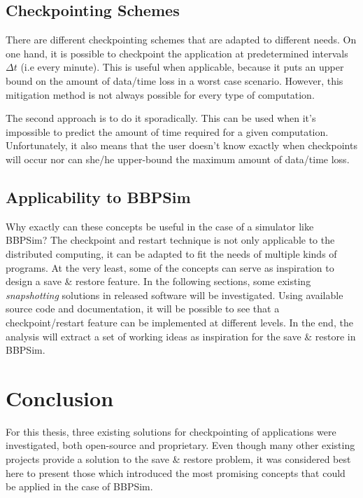 {\subsection*{Checkpointing Schemes}
There are different checkpointing schemes that are adapted to different needs. On one hand, it is possible to checkpoint the application at predetermined intervals $\Delta t$ (i.e every minute). This is useful when applicable, because it puts an upper bound on the amount of data/time loss in a worst case scenario. However, this mitigation method is not always possible for every type of computation. 

The second approach is to do it sporadically. This can be used when it's impossible to predict the amount of time required for a given computation. Unfortunately, it also means that the user doesn't know exactly when checkpoints will occur nor can she/he upper-bound the maximum amount of data/time loss.

\subsection*{Applicability to BBPSim}
Why exactly can these concepts be useful in the case of a simulator like BBPSim? The checkpoint and restart technique is not only applicable to the distributed computing, it can be adapted to fit the needs of multiple kinds of programs. At the very least, some of the concepts can serve as inspiration to design a save \& restore feature. In the following sections, some existing \textit{snapshotting} solutions in released software will be investigated. Using available source code and documentation, it will be possible to see that a checkpoint/restart feature can be implemented at different levels. In the end, the analysis will extract a set of working ideas as inspiration for the save \& restore in BBPSim.





\section{Conclusion}
For this thesis, three existing solutions for checkpointing of applications were investigated, both open-source and proprietary. Even though many other existing projects provide a solution to the save \& restore problem, it was considered best here to present those which introduced the most promising concepts that could be applied in the case of \gls{BBPSim}. 

}
